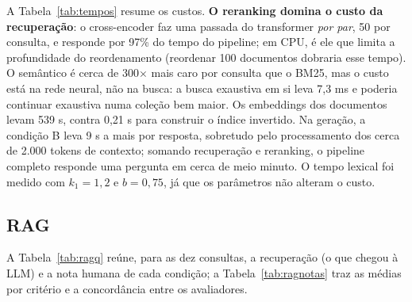 \documentclass[10pt,a4paper]{article}
\begin{document}
A Tabela~\ref{tab:tempos} resume os custos. \textbf{O reranking domina o custo da recuperação}: o cross-encoder faz uma passada do transformer \emph{por par}, 50 por consulta, e responde por 97\% do tempo do pipeline; em CPU, é ele que limita a profundidade do reordenamento (reordenar 100 documentos dobraria esse tempo). O semântico é cerca de 300$\times$ mais caro por consulta que o BM25, mas o custo está na rede neural, não na busca: a busca exaustiva em si leva 7,3 ms e poderia continuar exaustiva numa coleção bem maior. Os embeddings dos documentos levam 539 s, contra 0,21 s para construir o índice invertido. Na geração, a condição B leva 9 s a mais por resposta, sobretudo pelo processamento dos cerca de 2.000 tokens de contexto; somando recuperação e reranking, o pipeline completo responde uma pergunta em cerca de meio minuto. O tempo lexical foi medido com $k_1 = 1{,}2$ e $b = 0{,}75$, já que os parâmetros não alteram o custo.

\subsection{RAG}
\label{sec:res-rag}

A Tabela~\ref{tab:ragq} reúne, para as dez consultas, a recuperação (o que chegou à LLM) e a nota humana de cada condição; a Tabela~\ref{tab:ragnotas} traz as médias por critério e a concordância entre os avaliadores.
\end{document}
